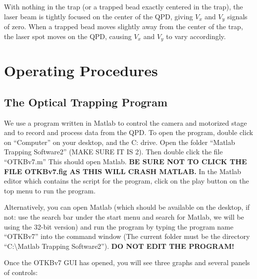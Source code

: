 \documentclass{../lab}
\begin{document}
With nothing in the trap (or a trapped bead exactly centered in the trap), the laser beam is tightly focused on the center of the QPD, giving $V_x$ and $V_y$ signals of zero. When a trapped bead moves slightly away from the center of the trap, the laser spot moves on the QPD, causing $V_x$ and $V_y$ to vary accordingly.

\section{Operating Procedures}

\subsection{The Optical Trapping Program}

We use a program written in Matlab to control the camera and motorized stage and to record and process data from the QPD. To open the program, double click on ``Computer'' on your desktop, and the C: drive. Open the folder ``Matlab Trapping Software2'' (MAKE SURE IT IS 2). Then double click the file ``OTKBv7.m'' This should open Matlab. \textbf{BE SURE NOT TO CLICK THE FILE OTKBv7.fig AS THIS WILL CRASH MATLAB.} In the Matlab editor which contains the script for the program, click on the play button on the top menu to run the program.

Alternatively, you can open Matlab (which should be available on the desktop, if not: use the search bar under the start menu and search for Matlab, we will be using the 32-bit version) and run the program by typing the program name ``OTKBv7'' into the command window (The current folder must be the directory ``C:\textbackslash Matlab Trapping Software2''). \textbf{DO NOT EDIT THE PROGRAM!}

Once the OTKBv7 GUI has opened, you will see three graphs and several panels of controls:
\end{document}
